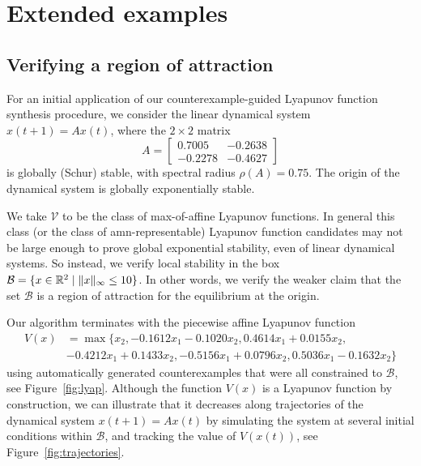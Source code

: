 \section{Extended examples}\label{sec:examples}

\subsection{Verifying a region of attraction}
For an initial application of our counterexample-guided Lyapunov function synthesis
procedure, we consider the linear dynamical system
$x(t+1)=Ax(t)$, where the $2\times 2$ matrix 
\[
	A = 
	\begin{bmatrix}
		0.7005 & -0.2638 \\
		-0.2278 & -0.4627
	\end{bmatrix}
\]
is globally (Schur) stable, with spectral radius $\rho(A)=0.75$. The origin of
the dynamical system is globally exponentially stable.

We take $\mathcal{V}$ to be the class of max-of-affine Lyapunov functions. In
general this class (or the class of \acs{amn}-representable)
Lyapunov function candidates may not be large enough to prove global
exponential stability, even of linear dynamical systems. So instead, we verify
local stability in the box
$\mathcal{B}=\{x\in\mathbb{R}^2 \mid \|x\|_\infty \leq 10\}$. In other
words, we verify the weaker claim that the set $\mathcal{B}$ is a region of
attraction for the equilibrium at the origin.  


Our algorithm terminates with the piecewise affine Lyapunov function
\begin{equation*}
\begin{aligned}
	V(x) &= \max\{
		x_2, 
		-0.1612x_1 -0.1020x_2,
		 0.4614x_1 +0.0155x_2,\\
		&-0.4212x_1 +0.1433x_2,
		-0.5156x_1 +0.0796x_2,
		 0.5036x_1 -0.1632x_2
	\}
\end{aligned}
\end{equation*}
using automatically generated counterexamples that were all constrained to
$\mathcal{B}$, see Figure~\ref{fig:lyap}. Although the function $V(x)$ is a
Lyapunov function by construction, we can illustrate that it decreases along
trajectories of the dynamical system $x(t+1)=Ax(t)$ by simulating the system at
several initial conditions within $\mathcal{B}$, and tracking the value of
$V(x(t))$, see Figure~\ref{fig:trajectories}.

